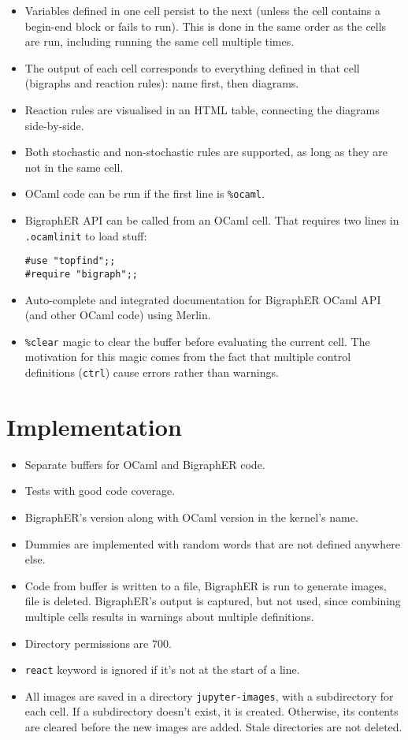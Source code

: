 \documentclass{article}
\begin{document}
\begin{itemize}
\item Variables defined in one cell persist to the next (unless the cell
  contains a begin-end block or fails to run). This is done in the same order as
  the cells are run, including running the same cell multiple times.
\item The output of each cell corresponds to everything defined in that cell
  (bigraphs and reaction rules): name first, then diagrams.
\item Reaction rules are visualised in an HTML table, connecting the diagrams
  side-by-side.
\item Both stochastic and non-stochastic rules are supported, as long as they
  are not in the same cell.
\item OCaml code can be run if the first line is \texttt{\%ocaml}.

\item BigraphER API can be called from an OCaml cell. That requires two lines in
  \texttt{.ocamlinit} to load stuff:
  \begin{lstlisting}
#use "topfind";;
#require "bigraph";;
  \end{lstlisting}
\item Auto-complete and integrated documentation for BigraphER OCaml API (and
  other OCaml code) using Merlin.
\item \texttt{\%clear} magic to clear the buffer before evaluating the current
  cell. The motivation for this magic comes from the fact that multiple
  control definitions (\texttt{ctrl}) cause errors rather than warnings.
\end{itemize}

\section{Implementation}

\begin{itemize}
\item Separate buffers for OCaml and BigraphER code.
\item Tests with good code coverage.
\item BigraphER's version along with OCaml version in the kernel's name.
\item Dummies are implemented with random words that are not defined anywhere else.
\item Code from buffer is written to a file, BigraphER is run to generate
  images, file is deleted. BigraphER's output is captured, but not used, since
  combining multiple cells results in warnings about multiple definitions.
\item Directory permissions are $700$.
\item \texttt{react} keyword is ignored if it's not at the start of a line.
\item All images are saved in a directory \texttt{jupyter-images}, with a
  subdirectory for each cell. If a subdirectory doesn't exist, it is created.
  Otherwise, its contents are cleared before the new images are added. Stale
  directories are not deleted.
\end{itemize}
\end{document}
